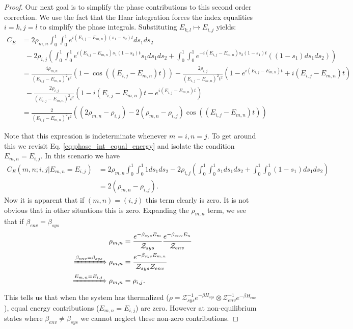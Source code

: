 \documentclass{article}
\newcommand{\parens}[1]{\left( #1 \right)}
\newcommand{\partfun}{\mathcal{Z}}
\begin{document}
\begin{proof}
Our next goal is to simplify the phase contributions to this second order correction. We use the fact that the Haar integration forces the index equalities $i = k, j = l$ to simplify the phase integrals. Substituting $E_{k,l} \mapsto E_{i,j}$ yields:
\begin{align}
    C_E &= 2 \rho_{m,n} \int_0^1 \int_0^1 e^{i(E_{i,j} - E_{m,n})(s_1 - s_2)t} ds_1 ds_2 \nonumber \\
    &~ ~ - 2 \rho_{i,j} \parens{\int_0^1 \int_0^1 e^{i (E_{i,j} - E_{m,n})s_1 (1- s_2)t}s_1 ds_1 ds_2 + \int_0^1 \int_0^1 e^{-i(E_{i,j} - E_{m,n})s_2(1-s_1)t}((1-s_1)ds_1 ds_2)} \label{eq:phase_int_equal_energy} \\
    &= \frac{4 \rho_{m,n}}{(E_{i,j} - E_{m,n})^2 t^2} (1 - \cos((E_{i,j} - E_{m,n})t)) - \frac{2 \rho_{i,j}}{(E_{i,j} - E_{m,n})^2 t^2} \parens{1 - e^{i (E_{i,j} - E_{m,n})t} + i (E_{i,j} - E_{m,n})t } \\
    & ~ ~ - \frac{2 \rho_{i,j}}{(E_{i,j} - E_{m,n})^2 t^2} \parens{1 - i (E_{i,j} - E_{m,n})t - e^{i(E_{i,j} - E_{m,n})t}} \\
    &= \frac{2}{(E_{i,j} - E_{m,n})^2 t^2} \parens{(2 \rho_{m,n} - \rho_{i,j}) - 2(\rho_{m,n} - \rho_{i,j}) \cos ((E_{i,j} - E_{m,n})t)}  
\end{align}

Note that this expression is indeterminate whenever $m = i, n = j$. To get around this we revisit Eq. \eqref{eq:phase_int_equal_energy} and isolate the condition $E_{m,n} = E_{i,j}$. In this scenario we have
\begin{align}
    C_E(m,n;i,j | E_{m,n} = E_{i,j}) &= 2 \rho_{m,n} \int_0^1 \int_0^1 1 ds_1 ds_2 - 2 \rho_{i,j} \parens{\int_0^1 \int_0^1 s_1 ds_1 ds_2 + \int_0^1 \int_0^1 (1-s_1) ds_1 ds_2} \\
    &= 2 (\rho_{m,n} - \rho_{i,j}).
\end{align}
Now it is apparent that if $(m,n) = (i,j)$ this term clearly is zero. It is not obvious that in other situations this is zero. Expanding the $\rho_{m,n}$ term, we see that if $\beta_{env} = \beta_{sys}$
\begin{align}
    \rho_{m,n} &= \frac{e^{-\beta_{sys} E_m}}{\partfun_{sys}} \frac{e^{-\beta_{env} E_{n}}}{\partfun_{env}} \\
    \xRightarrow{\beta_{env} = \beta_{sys}} \rho_{m,n} &= \frac{e^{-\beta_{sys}E_{m,n}}}{\partfun_{sys} \partfun_{env}} \\
    \xRightarrow{E_{m,n} = E_{i,j}} \rho_{m,n} &= \rho_{i,j}.
\end{align}
This tells us that when the system has thermalized ($\rho = \partfun_{sys}^{-1} e^{-\beta H_{sys}} \otimes \partfun_{env}^{-1} e^{-\beta H_{env}}$), equal energy contributions ($E_{m,n} = E_{i,j}$) are zero. However at non-equilibrium states where $\beta_{env} \neq \beta_{sys}$ we cannot neglect these non-zero contributions. 


\end{proof}
\end{document}
